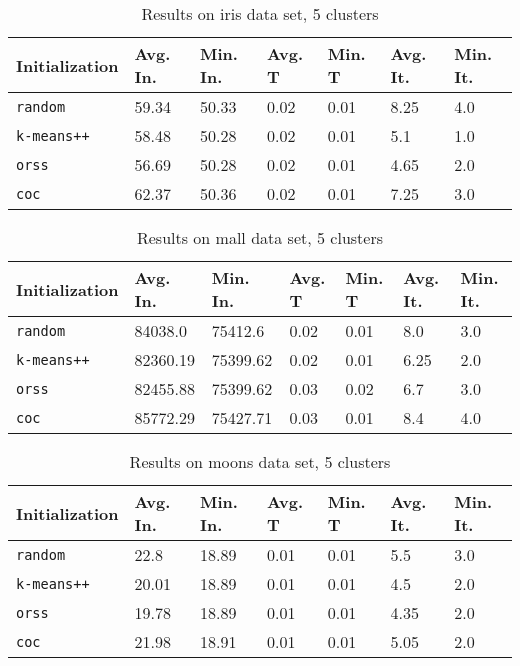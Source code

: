 \begin{table}[h]
	\begin{center}
		\begin{tabular}{|l|l|l|l|l|l|l|}
			\hline
			Initialization & Avg. In. & Min. In. & Avg. T & Min. T & Avg. It. & Min. It.\\\hline
			\texttt{random} & 59.34 & 50.33 & 0.02 & 0.01 & 8.25 & 4.0\\\hline
			\texttt{k-means++} & 58.48 & 50.28 & 0.02 & 0.01 & 5.1 & 1.0\\\hline
			\texttt{orss} & 56.69 & 50.28 & 0.02 & 0.01 & 4.65 & 2.0\\\hline
			\texttt{coc} & 62.37 & 50.36 & 0.02 & 0.01 & 7.25 & 3.0\\\hline
		\end{tabular}
		\caption{Results on iris data set, 5 clusters}
		\label{tbl:iris5}
	\end{center}
\end{table}

\begin{table}[h]
	\begin{center}
		\begin{tabular}{|l|l|l|l|l|l|l|}
			\hline
			Initialization & Avg. In. & Min. In. & Avg. T & Min. T & Avg. It. & Min. It.\\\hline
			\texttt{random} & 84038.0 & 75412.6 & 0.02 & 0.01 & 8.0 & 3.0\\\hline
			\texttt{k-means++} & 82360.19 & 75399.62 & 0.02 & 0.01 & 6.25 & 2.0\\\hline
			\texttt{orss} & 82455.88 & 75399.62 & 0.03 & 0.02 & 6.7 & 3.0\\\hline
			\texttt{coc} & 85772.29 & 75427.71 & 0.03 & 0.01 & 8.4 & 4.0\\\hline
		\end{tabular}
		\caption{Results on mall data set, 5 clusters}
		\label{tbl:mall5}
	\end{center}
\end{table}

\begin{table}[h]
	\begin{center}
		\begin{tabular}{|l|l|l|l|l|l|l|}
			\hline
			Initialization & Avg. In. & Min. In. & Avg. T & Min. T & Avg. It. & Min. It.\\\hline
			\texttt{random} & 22.8 & 18.89 & 0.01 & 0.01 & 5.5 & 3.0\\\hline
			\texttt{k-means++} & 20.01 & 18.89 & 0.01 & 0.01 & 4.5 & 2.0\\\hline
			\texttt{orss} & 19.78 & 18.89 & 0.01 & 0.01 & 4.35 & 2.0\\\hline
			\texttt{coc} & 21.98 & 18.91 & 0.01 & 0.01 & 5.05 & 2.0\\\hline
		\end{tabular}
		\caption{Results on moons data set, 5 clusters}
		\label{tbl:moons5}
	\end{center}
\end{table}

